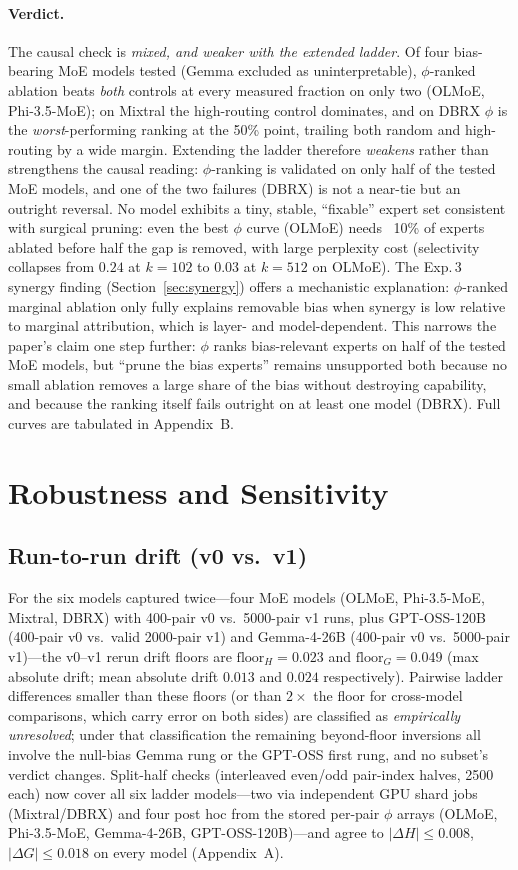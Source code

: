 \documentclass[sigconf]{acmart}
\begin{document}
\paragraph{Verdict.}
The causal check is \emph{mixed, and weaker with the extended ladder}. Of
four bias-bearing MoE models tested (Gemma excluded as uninterpretable),
$\phi$-ranked ablation beats \emph{both} controls at every measured
fraction on only two (OLMoE, Phi-3.5-MoE); on Mixtral the high-routing
control dominates, and on DBRX $\phi$ is the \emph{worst}-performing
ranking at the 50\% point, trailing both random and high-routing by a
wide margin. Extending the ladder therefore \emph{weakens} rather than
strengthens the causal reading: $\phi$-ranking is validated on only half
of the tested MoE models, and one of the two failures (DBRX) is not a
near-tie but an outright reversal. No model exhibits a tiny, stable,
``fixable'' expert set consistent with surgical pruning: even the best
$\phi$ curve (OLMoE) needs ~10\% of experts ablated before half the gap
is removed, with large perplexity cost (selectivity collapses from
$0.24$ at $k{=}102$ to $0.03$ at $k{=}512$ on OLMoE). The Exp.\,3 synergy
finding (Section~\ref{sec:synergy}) offers a mechanistic explanation:
$\phi$-ranked marginal ablation only fully explains removable bias when
synergy is low relative to marginal attribution, which is layer- and
model-dependent. This narrows the paper's claim one step further:
$\phi$ ranks bias-relevant experts on half of the tested MoE models, but
``prune the bias experts'' remains unsupported both because no small
ablation removes a large share of the bias without destroying
capability, and because the ranking itself fails outright on at least
one model (DBRX). Full curves are tabulated in Appendix~B.

\section{Robustness and Sensitivity}
\label{sec:robust}
\subsection{Run-to-run drift (v0 vs.\ v1)}
For the six models captured twice---four MoE models (OLMoE, Phi-3.5-MoE,
Mixtral, DBRX) with 400-pair v0 vs.\ 5000-pair v1 runs, plus GPT-OSS-120B
(400-pair v0 vs.\ valid 2000-pair v1) and Gemma-4-26B (400-pair v0 vs.\
5000-pair v1)---the v0--v1 rerun drift floors are $\mathrm{floor}_H = 0.023$
and $\mathrm{floor}_G = 0.049$ (max absolute drift; mean absolute drift
$0.013$ and $0.024$ respectively). Pairwise ladder differences smaller than
these floors (or than $2\times$ the floor for cross-model comparisons, which
carry error on both sides) are classified as \emph{empirically unresolved};
under that classification the remaining beyond-floor inversions all involve
the null-bias Gemma rung or the GPT-OSS first rung, and no subset's verdict
changes. Split-half checks (interleaved even/odd pair-index halves, 2500
each) now cover all six ladder models---two via independent GPU shard
jobs (Mixtral/DBRX) and four post hoc from the stored per-pair $\phi$
arrays (OLMoE, Phi-3.5-MoE, Gemma-4-26B, GPT-OSS-120B)---and agree to
$|\Delta H| \le 0.008$, $|\Delta G| \le 0.018$ on every model
(Appendix~A).
\end{document}
